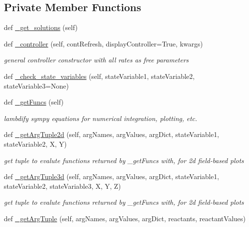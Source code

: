 \subsection*{Private Member Functions}
\begin{DoxyCompactItemize}
\item 
def \hyperlink{class_mu_mo_t_1_1_mu_mo_tmodel_ac8f6319b8c81e7c48d1f892603bcd307}{\+\_\+get\+\_\+solutions} (self)
\item 
def \hyperlink{class_mu_mo_t_1_1_mu_mo_tmodel_a6a0f9b6992419be85bb9d69b3b28782d}{\+\_\+controller} (self, cont\+Refresh, display\+Controller=True, kwargs)
\begin{DoxyCompactList}\small\item\em general controller constructor with all rates as free parameters \end{DoxyCompactList}\item 
def \hyperlink{class_mu_mo_t_1_1_mu_mo_tmodel_abef2b7019d8de30c16d7ade84ad45e09}{\+\_\+check\+\_\+state\+\_\+variables} (self, state\+Variable1, state\+Variable2, state\+Variable3=None)
\item 
def \hyperlink{class_mu_mo_t_1_1_mu_mo_tmodel_aa69fe5568e12577be5a63232d689e45e}{\+\_\+get\+Funcs} (self)
\begin{DoxyCompactList}\small\item\em lambdify sympy equations for numerical integration, plotting, etc. \end{DoxyCompactList}\item 
def \hyperlink{class_mu_mo_t_1_1_mu_mo_tmodel_a0965e5e61aa8f0d4e399e3b534d31a4c}{\+\_\+get\+Arg\+Tuple2d} (self, arg\+Names, arg\+Values, arg\+Dict, state\+Variable1, state\+Variable2, X, Y)
\begin{DoxyCompactList}\small\item\em get tuple to evalute functions returned by \+\_\+get\+Funcs with, for 2d field-\/based plots \end{DoxyCompactList}\item 
def \hyperlink{class_mu_mo_t_1_1_mu_mo_tmodel_a4a81885dd0451b6af31285c234b61d2a}{\+\_\+get\+Arg\+Tuple3d} (self, arg\+Names, arg\+Values, arg\+Dict, state\+Variable1, state\+Variable2, state\+Variable3, X, Y, Z)
\begin{DoxyCompactList}\small\item\em get tuple to evalute functions returned by \+\_\+get\+Funcs with, for 2d field-\/based plots \end{DoxyCompactList}\item 
def \hyperlink{class_mu_mo_t_1_1_mu_mo_tmodel_af547c59d7ec82de308ee85b118fc7295}{\+\_\+get\+Arg\+Tuple} (self, arg\+Names, arg\+Values, arg\+Dict, reactants, reactant\+Values)

\end{DoxyCompactItemize}
